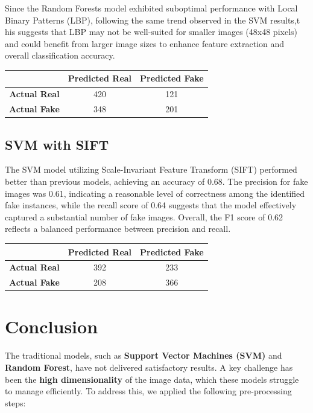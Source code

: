 \documentclass[10pt,twocolumn,letterpaper]{article}
\begin{document}
Since the Random Forests model exhibited suboptimal performance with Local Binary Patterns (LBP), following the same trend observed in the SVM results,t his suggests that LBP may not be well-suited for smaller images (48x48 pixels) and could benefit from larger image sizes to enhance feature extraction and overall classification accuracy.

\begin{table}[h]
    \centering
    \begin{tabular}{|c|c|c|}
        \hline
        & \textbf{Predicted Real} & \textbf{Predicted Fake} \\ \hline
        \textbf{Actual Real} & 420 & 121 \\ \hline
        \textbf{Actual Fake} & 348 & 201 \\ \hline
    \end{tabular}
\end{table}


\subsection{ SVM with SIFT}

The SVM model utilizing Scale-Invariant Feature Transform (SIFT) performed better than previous models, achieving an accuracy of 0.68. The precision for fake images was 0.61, indicating a reasonable level of correctness among the identified fake instances, while the recall score of 0.64 suggests that the model effectively captured a substantial number of fake images. Overall, the F1 score of 0.62 reflects a balanced performance between precision and recall.

\begin{table}[h]
    \centering
    \begin{tabular}{|c|c|c|}
        \hline
        & \textbf{Predicted Real} & \textbf{Predicted Fake} \\ \hline
        \textbf{Actual Real} & 392 & 233 \\ \hline
        \textbf{Actual Fake} & 208 & 366 \\ \hline
    \end{tabular}
\end{table}


\section{Conclusion}
The traditional models, such as \textbf{Support Vector Machines (SVM)} and \textbf{Random Forest}, have not delivered satisfactory results. A key challenge has been the \textbf{high dimensionality} of the image data, which these models struggle to manage efficiently. To address this, we applied the following pre-processing steps:
\end{document}
